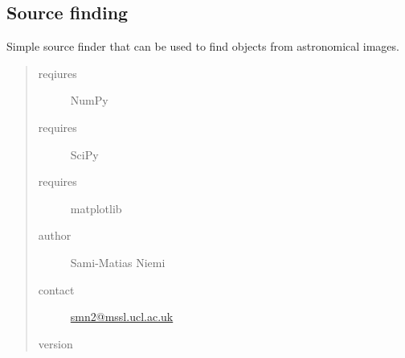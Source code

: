 \documentclass[a4paper,12pt,english]{sphinxmanual}
\begin{document}
\label{analysis:module-analysis.sourceFinder}

\subsection{Source finding}
\label{analysis:source-finding}
Simple source finder that can be used to find objects from astronomical images.
\begin{quote}\begin{description}
\item[{reqiures}] \leavevmode
NumPy

\item[{requires}] \leavevmode
SciPy

\item[{requires}] \leavevmode
matplotlib

\item[{author}] \leavevmode
Sami-Matias Niemi

\item[{contact}] \leavevmode
\href{mailto:smn2@mssl.ucl.ac.uk}{smn2@mssl.ucl.ac.uk}

\item[{version}] 

\end{description}\end{quote}
\end{document}
